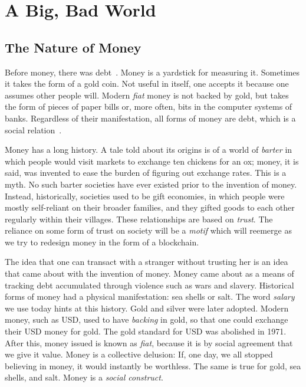 \chapter{A Big, Bad World}\label{chapter.untrusty-world}

\section{The Nature of Money}

Before money, there was debt~\cite{debt}. Money is a yardstick for measuring
it. Sometimes it takes the form of a gold coin. Not useful in itself, one
accepts it because one assumes other people will. Modern \emph{fiat} money is
not backed by gold, but takes the form of pieces of paper bills or, more often,
bits in the computer systems of banks. Regardless of their manifestation, all
forms of money are debt, which is a social relation~\cite{critical-realism}.

Money has a long history. A tale told about its origins
is of a world of \emph{barter} in which people would visit
markets to exchange ten chickens for an ox; money, it is said, was invented
to ease the burden of figuring out exchange rates. This is a myth.
No such barter societies have ever existed prior to the invention of
money. Instead, historically, societies used to be gift economies,
in which people were mostly self-reliant on their broader families,
and they gifted goods to each other regularly within their villages.
These relationships are based on \emph{trust}. The reliance on some
form of trust on society will be a \emph{motif} which will
reemerge as we try to redesign money in the form of a blockchain.

The idea that one can transact with a stranger without trusting her
is an idea that came about with the invention of money. Money came
about as a means of tracking debt accumulated through violence such
as wars and slavery. Historical forms of money had a physical manifestation:
sea shells or salt. The word \emph{salary} we
use today hints at this history. Gold and silver were later adopted.
Modern money, such as USD, used to have \emph{backing} in gold, so
that one could exchange their USD money for gold. The gold standard
for USD was abolished in 1971. After this, money issued is known as
\emph{fiat}, because it is by social agreement that we give it value.
Money is a collective delusion: If, one day, we all stopped believing
in money, it would instantly be worthless. The same is true for gold,
sea shells, and salt. Money is a \emph{social construct}.

